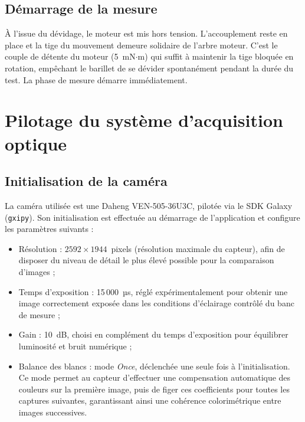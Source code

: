 \subsection{Démarrage de la mesure}

À l'issue du dévidage, le moteur est mis hors tension. L'accouplement
reste en place et la tige du mouvement demeure solidaire de l'arbre
moteur. C'est le couple de détente du moteur (5~mN$\cdot$m) qui suffit à
maintenir la tige bloquée en rotation, empêchant le barillet de se dévider
spontanément pendant la durée du test. La phase de mesure démarre
immédiatement.


\section{Pilotage du système d'acquisition optique}

\subsection{Initialisation de la caméra}

La caméra utilisée est une Daheng VEN-505-36U3C, pilotée via le SDK
Galaxy (\texttt{gxipy}). Son initialisation est effectuée au démarrage
de l'application et configure les paramètres suivants :

\begin{itemize}
    \item Résolution : $2592 \times 1944$~pixels (résolution
          maximale du capteur), afin de disposer du niveau de détail
          le plus élevé possible pour la comparaison d'images ;
    \item Temps d'exposition : 15\,000~µs, réglé
          expérimentalement pour obtenir une image correctement exposée
          dans les conditions d'éclairage contrôlé du banc de mesure ;
    \item Gain : 10~dB, choisi en complément du temps
          d'exposition pour équilibrer luminosité et bruit numérique ;
    \item Balance des blancs : mode \textit{Once}, déclenchée
          une seule fois à l'initialisation. Ce mode permet au capteur
          d'effectuer une compensation automatique des couleurs sur la
          première image, puis de figer ces coefficients pour toutes
          les captures suivantes, garantissant ainsi une cohérence
          colorimétrique entre images successives.
\end{itemize}

